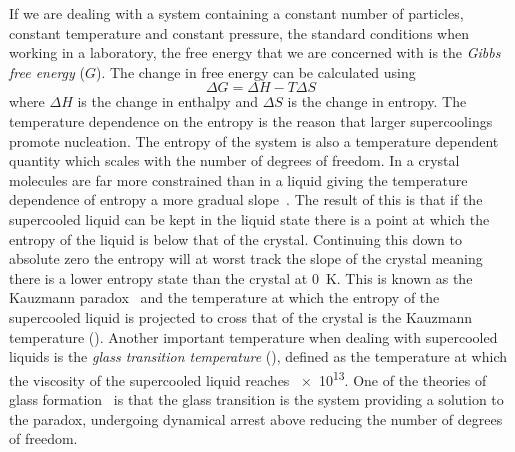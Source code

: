 If we are dealing with a system containing a constant number of particles, constant temperature and constant pressure, the standard conditions when working in a laboratory, the free energy that we are concerned with is the \emph{Gibbs free energy} ($G$). The change in free energy can be calculated using
\begin{equation}
    \Delta G = \Delta H - T\Delta S
\end{equation}
where $\Delta H$ is the change in enthalpy and $\Delta S$ is the change in entropy. The temperature dependence on the entropy is the reason that larger supercoolings promote nucleation. The entropy of the system is also a temperature dependent quantity which scales with the number of degrees of freedom. In a crystal molecules are far more constrained than in a liquid giving the temperature dependence of entropy a more gradual slope~. The result of this is that if the supercooled liquid can be kept in the liquid state there is a point at which the entropy of the liquid is below that of the crystal. Continuing this down to absolute zero the entropy will at worst track the slope of the crystal meaning there is a lower entropy state than the crystal at \SI{0}{\kelvin}. This is known as the Kauzmann paradox~\cite{kauzmann:48} and the temperature at which the entropy of the supercooled liquid is projected to cross that of the crystal is the Kauzmann temperature (\si{\Tk}). Another important temperature when dealing with supercooled liquids is the \emph{glass transition temperature} (\si{\Tg}), defined as the temperature at which the viscosity of the supercooled liquid reaches \SI{e13}{\poise}. One of the theories of glass formation~\cite{debenedetti:01} is that the glass transition is the system providing a solution to the paradox, undergoing dynamical arrest above \si{\Tk} reducing the number of degrees of freedom.

\begin{figure}
    \label{fig:entropy}
\end{figure}


